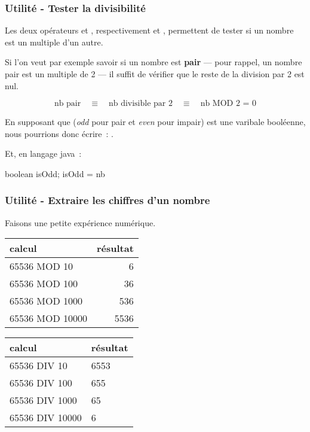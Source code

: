 			
			
		\subsubsection{Utilité - Tester la divisibilité}
		
			Les deux opérateurs  et , respectivement \pc{/} et
			\pc{\%}, permettent de tester si un nombre est un multiple d’un
			autre.

			Si l'on veut par exemple savoir si un nombre est \textbf{pair}
			— pour rappel, un nombre pair est un multiple de 2 — il suffit 
			de vérifier que le reste de la division par 2 est nul.
			
			\[
			\textrm{nb pair} 
				\quad\equiv\quad \textrm{nb divisible par 2} 
				\quad\equiv\quad \textrm{nb MOD 2 = 0} 
			\]
			
			En supposant que  (\textit{odd} pour pair et \textit{even}
			pour impair) est une varibale booléenne, nous pourrions donc
			écrire~: .

			Et, en langage java~:

			\begin{java}
boolean isOdd;
isOdd = nb %
			\end{java}

		\subsubsection{Utilité - Extraire les chiffres d’un nombre}
		
			Faisons une petite expérience numérique.
			\begin{center}
			\begin{tabular}{|l|r|}\hline
				\rowcolor{black!20}
				calcul & résultat \\
				\hline
				65536 MOD 10 & 6 \\  
				65536 MOD 100 & 36 \\  
				65536 MOD 1000 & 536 \\  
				65536 MOD 10000 & 5536 \\ 
				\hline 
			\end{tabular}
			\qquad
			\begin{tabular}{|l|l|}\hline
				\rowcolor{black!20}
				calcul & résultat \\
				\hline
				65536 DIV 10 & 6553 \\  
				65536 DIV 100 & 655 \\  
				65536 DIV 1000 & 65 \\  
				65536 DIV 10000 & 6 \\ 
				\hline 
			\end{tabular}
			\end{center}
		
